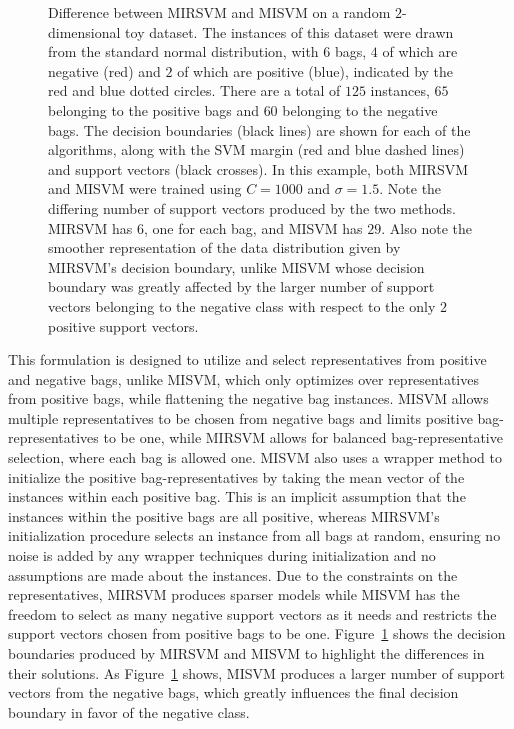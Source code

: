 \documentclass[preprint,12pt]{elsarticle}
\begin{document}
\begin{figure}
\begin{minipage}{0.5\textwidth}
    \end{minipage}
    \caption{Difference between MIRSVM and MISVM on a random $2$-dimensional toy dataset. The instances of this dataset were drawn from the standard normal distribution, with $6$ bags, $4$ of which are negative (red) and $2$ of which are positive (blue), indicated by the red and blue dotted circles. There are a total of $125$ instances, $65$ belonging to the positive bags and $60$ belonging to the negative bags. The decision boundaries (black lines) are shown for each of the algorithms, along with the SVM margin (red and blue dashed lines) and support vectors (black crosses). In this example, both MIRSVM and MISVM were trained using $C = 1000$ and $\sigma = 1.5$. Note the differing number of support vectors produced by the two methods. MIRSVM has $6$, one for each bag, and MISVM has $29$. Also note the smoother representation of the data distribution given by MIRSVM's decision boundary, unlike MISVM whose decision boundary was greatly affected by the larger number of support vectors belonging to the negative class with respect to the only $2$ positive support vectors. }\label{fig:diff}
\end{figure}
\newpage
This formulation is designed to utilize and select representatives from positive and negative bags, unlike MISVM, which only optimizes over representatives from positive bags, while flattening the negative bag instances. MISVM allows multiple representatives to be chosen from negative bags and limits positive bag-representatives to be one, while MIRSVM allows for balanced bag-representative selection, where each bag is allowed one. MISVM also uses a wrapper method to initialize the positive bag-representatives by taking the mean vector of the instances within each positive bag. This is an implicit assumption that the instances within the positive bags are all positive, whereas MIRSVM's initialization procedure selects an instance from all bags at random, ensuring no noise is added by any wrapper techniques during initialization and no assumptions are made about the instances. Due to the constraints on the representatives, MIRSVM produces sparser models while MISVM has the freedom to select as many negative support vectors as it needs and restricts the support vectors chosen from positive bags to be one. Figure~\ref{fig:diff} shows the decision boundaries produced by MIRSVM and MISVM to highlight the differences in their solutions. As Figure~\ref{fig:diff} shows, MISVM produces a larger number of support vectors from the negative bags, which greatly influences the final decision boundary in favor of the negative class.
\newpage
\end{document}
